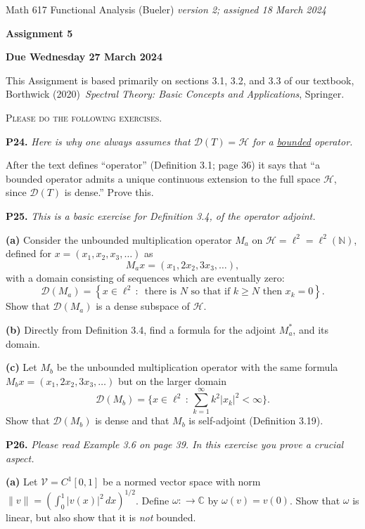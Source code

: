 \documentclass[12pt]{amsart}
\newcommand{\cD}{\mathcal{D}}
\newcommand{\cH}{\mathcal{H}}
\newcommand{\cV}{\mathcal{V}}
\newcommand{\CC}{\mathbb{C}}
\newcommand{\NN}{\mathbb{N}}
\newcommand{\prob}[1]{\bigskip\noindent\textbf{#1.}\quad }
\newcommand{\epart}[1]{\medskip\noindent\textbf{(#1)}\quad }
\begin{document}
\scriptsize \noindent Math 617 Functional Analysis (Bueler) \hfill \emph{version 2; assigned 18 March 2024}
\normalsize\medskip

\Large\centerline{\textbf{Assignment 5}}
\large
\medskip

\centerline{\textbf{Due Wednesday 27 March 2024}}
\medskip
\normalsize

\thispagestyle{empty}

\bigskip
\noindent This Assignment is based primarily on sections 3.1, 3.2, and 3.3 of our textbook, Borthwick (2020)~\emph{Spectral Theory: Basic Concepts and Applications}, Springer.

\medskip
\noindent \textsc{Please do the following exercises.}
\smallskip


\prob{P24}  \emph{Here is why one always assumes that $\cD(T) = \cH$ for a \underline{bounded} operator.}

\medskip \noindent After the text defines ``operator'' (Definition 3.1; page 36) it says that ``a bounded operator admits a unique continuous extension to the full space $\cH$, since $\cD(T)$ is dense.''  Prove this.


\prob{P25}  \emph{This is a basic exercise for Definition 3.4, of the operator adjoint.}

\epart{a} Consider the unbounded multiplication operator $M_a$ on $\cH=\ell^2=\ell^2(\NN)$, defined for $x=(x_1,x_2,x_3,\dots)$ as
	$$M_a x = (x_1, 2 x_2, 3 x_3, \dots),$$
with a domain consisting of sequences which are eventually zero:
	$$\cD(M_a) = \left\{x \in \ell^2\,:\,\text{ there is $N$ so that if $k\ge N$ then } x_k=0\right\}.$$
Show that $\cD(M_a)$ is a dense subspace of $\cH$.

\epart{b} Directly from Definition 3.4, find a formula for the adjoint $M_a^*$, and its domain.

\epart{c} Let $M_b$ be the unbounded multiplication operator with the same formula $M_b x = (x_1, 2 x_2, 3 x_3, \dots)$ but on the larger domain
    $$\cD(M_b) = \Big\{x \in \ell^2\,:\, \sum_{k=1}^\infty k^2 |x_k|^2 < \infty\Big\}.$$
Show that $\cD(M_b)$ is dense and that $M_b$ is self-adjoint (Definition 3.19).


\prob{P26}  \emph{Please read Example 3.6 on page 39.  In this exercise you prove a crucial aspect.}

\epart{a} Let $\cV = C^1[0,1]$ be a normed vector space with norm $\|v\| = \left(\int_0^1 |v(x)|^2\,dx\right)^{1/2}$.  Define $\omega: \to \CC$ by $\omega(v) = v(0)$.  Show that $\omega$ is linear, but also show that it is \emph{not} bounded.
\end{document}
